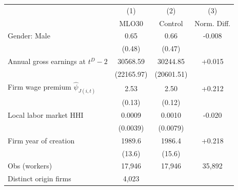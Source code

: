 {
\begin{tabular}{lccc}
\hline\hline
 & (1) & (2) & (3) \\
 & MLO30 & Control & Norm. Diff. \\
\hline
Gender: Male & 0.65 & 0.66 & -0.008 \\
 & (0.48) & (0.47) &  \\
Annual gross earnings at $t^D-2$ & 30568.59 & 30244.85 & +0.015 \\
 & (22165.97) & (20601.51) &  \\
Firm wage premium $\widehat{\psi}_{J(i,t)}$ & 2.53 & 2.50 & +0.212 \\
 & (0.13) & (0.12) &  \\
Local labor market HHI & 0.0009 & 0.0010 & -0.020 \\
 & (0.0039) & (0.0079) &  \\
Firm year of creation & 1989.6 & 1986.4 & +0.218 \\
 & (13.6) & (15.6) &  \\
\hline
Obs (workers) & 17,946 & 17,946 & 35,892 \\
Distinct origin firms & 4,023 &  &  \\
\hline\hline
\end{tabular}
}
